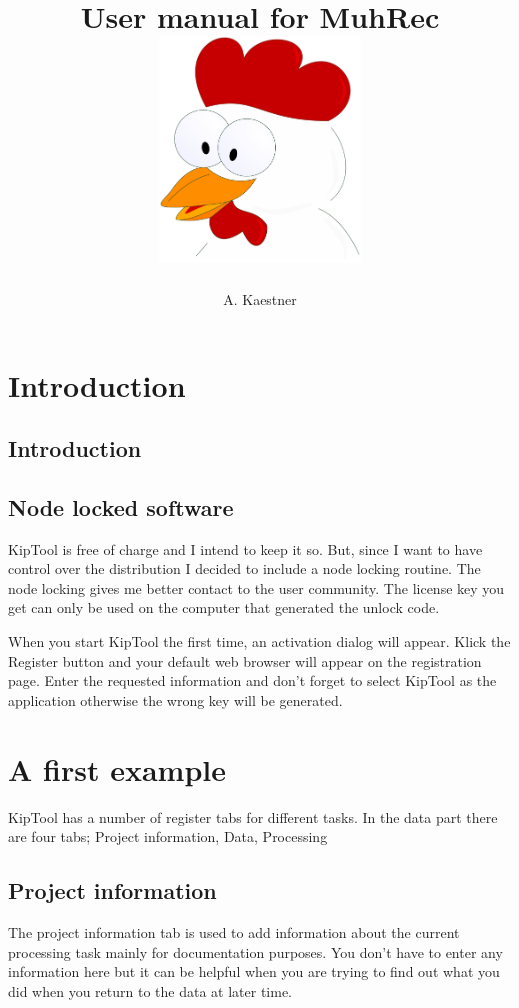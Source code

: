 \documentclass[a4paper]{scrreprt}
\title{User manual for MuhRec\\\vskip30pt\includegraphics[width=0.4\textwidth]{figures/kip_icon.pdf}}
\author{A. Kaestner}
\begin{document}
\maketitle
\tableofcontents
\chapter{Introduction}
\section{Introduction}

\section{Node locked software}
KipTool is free of charge and I intend to keep it so. But, since I want to have control over
the distribution I decided to include a node locking routine. The node locking gives me
better contact to the user community. The license key you get can only be used on the
computer that generated the unlock code.

When you start KipTool the first time, an activation dialog will appear. Klick the Register button and your default web browser will appear on the registration page. Enter the requested information and don't forget to select KipTool as the application otherwise the wrong key will be generated.

\chapter{A first example}
KipTool has a number of register tabs for different tasks. In the data part there are four tabs; Project information, Data, Processing
\section{Project information}
The project information tab is used to add information about the current processing task mainly for documentation purposes. You don't have to enter any information here but it can be helpful when you are trying to find out what you did when you return to the data at later time.
\end{document}
